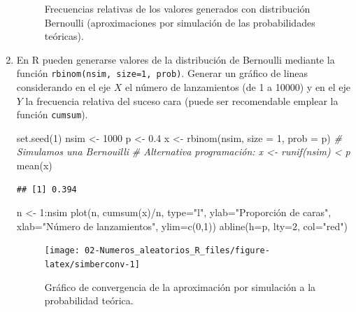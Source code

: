 \documentclass[
]{book}
\newenvironment{Shaded}{\begin{snugshade}}{\end{snugshade}}
\newcommand{\AttributeTok}[1]{\textcolor[rgb]{0.77,0.63,0.00}{#1}}
\newcommand{\CommentTok}[1]{\textcolor[rgb]{0.56,0.35,0.01}{\textit{#1}}}
\newcommand{\DecValTok}[1]{\textcolor[rgb]{0.00,0.00,0.81}{#1}}
\newcommand{\FloatTok}[1]{\textcolor[rgb]{0.00,0.00,0.81}{#1}}
\newcommand{\FunctionTok}[1]{\textcolor[rgb]{0.00,0.00,0.00}{#1}}
\newcommand{\NormalTok}[1]{#1}
\newcommand{\OtherTok}[1]{\textcolor[rgb]{0.56,0.35,0.01}{#1}}
\newcommand{\SpecialCharTok}[1]{\textcolor[rgb]{0.00,0.00,0.00}{#1}}
\newcommand{\StringTok}[1]{\textcolor[rgb]{0.31,0.60,0.02}{#1}}
\theoremstyle{break}
\theoremstyle{definition}
\theoremstyle{definition}
\theoremstyle{definition}
\theoremstyle{definition}
\theoremstyle{remark}
\begin{document}
\begin{enumerate}
\begin{figure}[!htb]
{  }

  \caption{Frecuencias relativas de los valores generados con distribución Bernoulli (aproximaciones por simulación de las probabilidades teóricas).}\label{fig:simberplot}
  \end{figure}
\item
  En R pueden generarse valores de la distribución de Bernoulli
  mediante la función \texttt{rbinom(nsim,\ size=1,\ prob)}. Generar un
  gráfico de lineas considerando en el eje \(X\) el número de
  lanzamientos (de 1 a 10000) y en el eje \(Y\) la frecuencia
  relativa del suceso cara (puede ser recomendable emplear la
  función \texttt{cumsum}).

\begin{Shaded}
\begin{Highlighting}[]
\FunctionTok{set.seed}\NormalTok{(}\DecValTok{1}\NormalTok{)}
\NormalTok{nsim }\OtherTok{\textless{}{-}} \DecValTok{1000}
\NormalTok{p }\OtherTok{\textless{}{-}} \FloatTok{0.4}
\NormalTok{x }\OtherTok{\textless{}{-}} \FunctionTok{rbinom}\NormalTok{(nsim, }\AttributeTok{size =} \DecValTok{1}\NormalTok{, }\AttributeTok{prob =}\NormalTok{ p) }\CommentTok{\# Simulamos una Bernouilli}
\CommentTok{\# Alternativa programación: x \textless{}{-} runif(nsim) \textless{} p}
\FunctionTok{mean}\NormalTok{(x)}
\end{Highlighting}
\end{Shaded}

\begin{verbatim}
## [1] 0.394
\end{verbatim}

\begin{Shaded}
\begin{Highlighting}[]
\NormalTok{n }\OtherTok{\textless{}{-}} \DecValTok{1}\SpecialCharTok{:}\NormalTok{nsim}
\FunctionTok{plot}\NormalTok{(n, }\FunctionTok{cumsum}\NormalTok{(x)}\SpecialCharTok{/}\NormalTok{n, }\AttributeTok{type=}\StringTok{"l"}\NormalTok{, }\AttributeTok{ylab=}\StringTok{"Proporción de caras"}\NormalTok{, }
     \AttributeTok{xlab=}\StringTok{"Número de lanzamientos"}\NormalTok{, }\AttributeTok{ylim=}\FunctionTok{c}\NormalTok{(}\DecValTok{0}\NormalTok{,}\DecValTok{1}\NormalTok{))}
\FunctionTok{abline}\NormalTok{(}\AttributeTok{h=}\NormalTok{p, }\AttributeTok{lty=}\DecValTok{2}\NormalTok{, }\AttributeTok{col=}\StringTok{"red"}\NormalTok{)}
\end{Highlighting}
\end{Shaded}

  \begin{figure}[!htb]

  {\centering \texttt{[image: 02-Numeros\_aleatorios\_R\_files/figure-latex/simberconv-1]} 

  }

  \caption{Gráfico de convergencia de la aproximación por simulación a la probabilidad teórica.}\label{fig:simberconv}
  \end{figure}
\end{enumerate}
\end{document}
